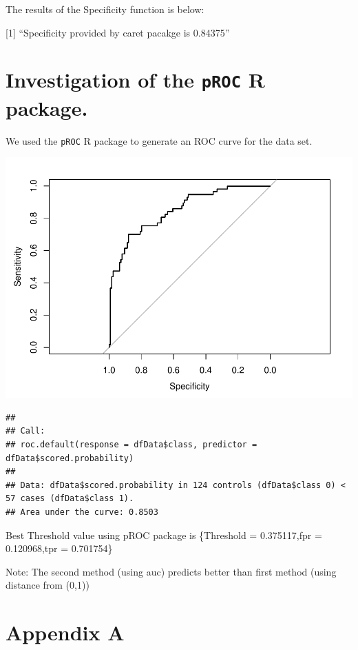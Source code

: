 \documentclass[]{article}
\begin{document}
The results of the Specificity function is below:

{[}1{]} ``Specificity provided by caret pacakge is 0.84375''

\pagebreak

\section{\texorpdfstring{Investigation of the \texttt{pROC} R
package.}{Investigation of the pROC R package.}}\label{investigation-of-the-proc-r-package.}

We used the \texttt{pROC} R package to generate an ROC curve for the
data set.

\includegraphics{Homework_2_files/figure-latex/unnamed-chunk-23-1.pdf}

\begin{verbatim}
## 
## Call:
## roc.default(response = dfData$class, predictor = dfData$scored.probability)
## 
## Data: dfData$scored.probability in 124 controls (dfData$class 0) < 57 cases (dfData$class 1).
## Area under the curve: 0.8503
\end{verbatim}

Best Threshold value using pROC package is \{Threshold = 0.375117,fpr =
0.120968,tpr = 0.701754\}

Note: The second method (using auc) predicts better than first method
(using distance from (0,1))

\newpage

\section{Appendix A}\label{appendix-a}
\end{document}
